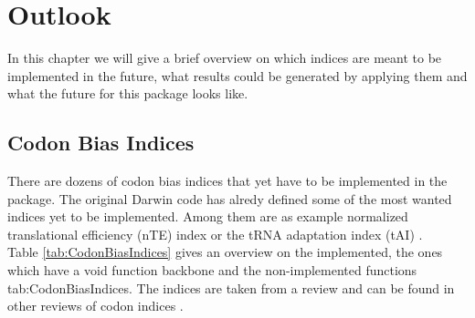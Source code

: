 \chapter{Outlook}
In this chapter we will give a brief overview on which indices are meant to be implemented in the future, what results could be generated by applying them and what the future for this package looks like. 


\section{Codon Bias Indices}
There are dozens of codon bias indices that yet have to be implemented in the package. The original Darwin code has alredy defined some of the most wanted indices yet to be implemented. Among them are as example normalized translational efficiency (nTE) index or the tRNA adaptation index (tAI) \cite{Goodman2013}. \\
Table \ref{tab:CodonBiasIndices} gives an overview on the implemented, the ones which have a void function backbone and the non-implemented functions {tab:CodonBiasIndices}. The indices are taken from a review \cite{BinderCh13} and can be found in other reviews of codon indices \cite{Jansen2003}.

